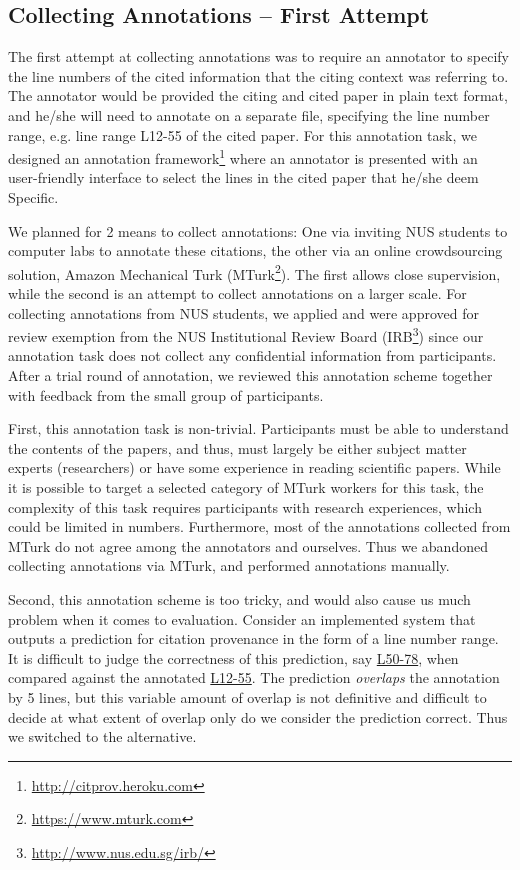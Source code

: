 \subsection*{Collecting Annotations -- First Attempt}
The first attempt at collecting annotations was to require an annotator to specify the line numbers of the cited information that the citing context was referring to. The annotator would be provided the citing and cited paper in plain text format, and he/she will need to annotate on a separate file, specifying the line number range, e.g. line range L12-55 of the cited paper. For this annotation task, we designed an annotation framework\footnote{\url{http://citprov.heroku.com}} where an annotator is presented with an user-friendly interface to select the lines in the cited paper that he/she deem Specific. 

We planned for 2 means to collect annotations: One via inviting NUS students to computer labs to annotate these citations, the other via an online crowdsourcing solution, Amazon Mechanical Turk (MTurk\footnote{\url{https://www.mturk.com}}). The first allows close supervision, while the second is an attempt to collect annotations on a larger scale. For collecting annotations from NUS students, we applied and were approved for review exemption from the NUS Institutional Review Board (IRB\footnote{\url{http://www.nus.edu.sg/irb/}}) since our annotation task does not collect any confidential information from participants. After a trial round of annotation, we reviewed this annotation scheme together with feedback from the small group of participants.

First, this annotation task is non-trivial. Participants must be able to understand the contents of the papers, and thus, must largely be either subject matter experts (researchers) or have some experience in reading scientific papers. While it is possible to target a selected category of MTurk workers for this task, the complexity of this task requires participants with research experiences, which could be limited in numbers. Furthermore, most of the annotations collected from MTurk do not agree among the annotators and ourselves. Thus we abandoned collecting annotations via MTurk, and performed annotations manually.

Second, this annotation scheme is too tricky, and would also cause us much problem when it comes to evaluation. Consider an implemented system that outputs a prediction for citation provenance in the form of a line number range. It is difficult to judge the correctness of this prediction, say \url{L50-78}, when compared against the annotated \url{L12-55}. The prediction \textit{overlaps} the annotation by 5 lines, but this variable amount of overlap is not definitive and difficult to decide at what extent of overlap only do we consider the prediction correct. Thus we switched to the alternative.

